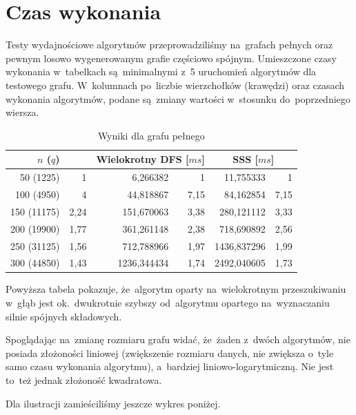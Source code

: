 \documentclass[a4paper,12pt]{mwart}
\begin{document}
\section{Czas wykonania}

Testy wydajnościowe algorytmów przeprowadziliśmy na~grafach pełnych oraz pewnym
losowo wygenerowanym grafie częściowo spójnym. Umieszczone czasy wykonania
w~tabelkach są~minimalnymi z~5 uruchomień algorytmów dla testowego grafu.
W~kolumnach po~liczbie wierzchołków (krawędzi) oraz czasach wykonania
algorytmów, podane są~zmiany wartości w~stosunku do~poprzedniego wiersza.

\begin{table}[H]
  \centering
  \begin{tabular}{ r r r r r r }
    \multicolumn{2}{c}{$n$ ($q$)} & \multicolumn{2}{c}{Wielokrotny DFS [$ms$]} & \multicolumn{2}{c}{SSS [$ms$]} \\
    \hline
    50 (1225) & 1 & 6,266382 & 1 & 11,755333 & 1 \\
    100 (4950) & 4 & 44,818867 & 7,15 & 84,162854 & 7,15 \\
    150 (11175) & 2,24 & 151,670063 & 3,38 & 280,121112 & 3,33 \\
    200 (19900) & 1,77 & 361,261148 & 2,38 & 718,690892 & 2,56 \\
    250 (31125) & 1,56 & 712,788966 & 1,97 & 1436,837296 & 1,99 \\
    300 (44850) & 1,43 & 1236,344434 & 1,74 & 2492,040605 & 1,73 \\
  \end{tabular}
  \caption{Wyniki dla grafu pełnego}
\end{table}

Powyższa tabela pokazuje, że~algorytm oparty na~wielokrotnym przeszukiwaniu
w~głąb jest ok.~dwukrotnie szybszy od~algorytmu opartego na~wyznaczaniu silnie
spójnych składowych.

Spoglądając na~zmianę rozmiaru grafu widać, że~żaden z~dwóch algorytmów, nie
posiada złożoności liniowej (zwiększenie rozmiaru danych, nie zwiększa o~tyle
samo czasu wykonania algorytmu), a~bardziej
liniowo-loga\dywiz{}ryt\dywiz{}miczną. Nie jest to~też jednak złożoność
kwadratowa.

Dla ilustracji zamieściliśmy jeszcze wykres poniżej.
\end{document}
